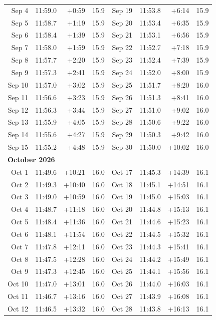 {\begin{longtable}{r r r r | r r r r}
Sep 4 & 11:59.0 & +0:59 & 15.9 & Sep 19 & 11:53.8 & +6:14 & 15.9 \\
Sep 5 & 11:58.7 & +1:19 & 15.9 & Sep 20 & 11:53.4 & +6:35 & 15.9 \\
Sep 6 & 11:58.4 & +1:39 & 15.9 & Sep 21 & 11:53.1 & +6:56 & 15.9 \\
Sep 7 & 11:58.0 & +1:59 & 15.9 & Sep 22 & 11:52.7 & +7:18 & 15.9 \\
Sep 8 & 11:57.7 & +2:20 & 15.9 & Sep 23 & 11:52.4 & +7:39 & 15.9 \\
Sep 9 & 11:57.3 & +2:41 & 15.9 & Sep 24 & 11:52.0 & +8:00 & 15.9 \\
Sep 10 & 11:57.0 & +3:02 & 15.9 & Sep 25 & 11:51.7 & +8:20 & 16.0 \\
Sep 11 & 11:56.6 & +3:23 & 15.9 & Sep 26 & 11:51.3 & +8:41 & 16.0 \\
Sep 12 & 11:56.3 & +3:44 & 15.9 & Sep 27 & 11:51.0 & +9:02 & 16.0 \\
Sep 13 & 11:55.9 & +4:05 & 15.9 & Sep 28 & 11:50.6 & +9:22 & 16.0 \\
Sep 14 & 11:55.6 & +4:27 & 15.9 & Sep 29 & 11:50.3 & +9:42 & 16.0 \\
Sep 15 & 11:55.2 & +4:48 & 15.9 & Sep 30 & 11:50.0 & +10:02 & 16.0 \\
\multicolumn{8}{l}{\textbf{October 2026}}\\
Oct 1 & 11:49.6 & +10:21 & 16.0 & Oct 17 & 11:45.3 & +14:39 & 16.1 \\
Oct 2 & 11:49.3 & +10:40 & 16.0 & Oct 18 & 11:45.1 & +14:51 & 16.1 \\
Oct 3 & 11:49.0 & +10:59 & 16.0 & Oct 19 & 11:45.0 & +15:03 & 16.1 \\
Oct 4 & 11:48.7 & +11:18 & 16.0 & Oct 20 & 11:44.8 & +15:13 & 16.1 \\
Oct 5 & 11:48.4 & +11:36 & 16.0 & Oct 21 & 11:44.6 & +15:23 & 16.1 \\
Oct 6 & 11:48.1 & +11:54 & 16.0 & Oct 22 & 11:44.5 & +15:32 & 16.1 \\
Oct 7 & 11:47.8 & +12:11 & 16.0 & Oct 23 & 11:44.3 & +15:41 & 16.1 \\
Oct 8 & 11:47.5 & +12:28 & 16.0 & Oct 24 & 11:44.2 & +15:49 & 16.1 \\
Oct 9 & 11:47.3 & +12:45 & 16.0 & Oct 25 & 11:44.1 & +15:56 & 16.1 \\
Oct 10 & 11:47.0 & +13:01 & 16.0 & Oct 26 & 11:44.0 & +16:03 & 16.1 \\
Oct 11 & 11:46.7 & +13:16 & 16.0 & Oct 27 & 11:43.9 & +16:08 & 16.1 \\
Oct 12 & 11:46.5 & +13:32 & 16.0 & Oct 28 & 11:43.8 & +16:13 & 16.1 \\

\end{longtable}}

